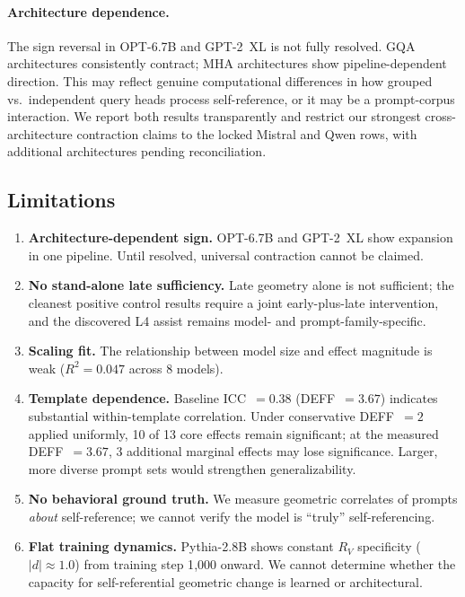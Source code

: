 \documentclass{article}
\newcommand{\RV}{R_V}
\newcommand{\dcohen}{d}
\begin{document}
\paragraph{Architecture dependence.}
The sign reversal in OPT-6.7B and GPT-2~XL is not fully resolved.
GQA architectures consistently contract; MHA architectures show pipeline-dependent direction.
This may reflect genuine computational differences in how grouped vs.\ independent query heads
process self-reference, or it may be a prompt-corpus interaction.
We report both results transparently and restrict our strongest cross-architecture contraction
claims to the locked Mistral and Qwen rows, with additional architectures pending reconciliation.

\subsection{Limitations}

\begin{enumerate}
\item \textbf{Architecture-dependent sign.}
      OPT-6.7B and GPT-2~XL show expansion in one pipeline. Until resolved, universal
      contraction cannot be claimed.
\item \textbf{No stand-alone late sufficiency.}
      Late geometry alone is not sufficient; the cleanest positive control results require a
      joint early-plus-late intervention, and the discovered L4 assist remains
      model- and prompt-family-specific.
\item \textbf{Scaling fit.}
      The relationship between model size and effect magnitude is weak
      ($R^2 = 0.047$ across 8 models).
\item \textbf{Template dependence.}
      Baseline ICC~$= 0.38$ (DEFF~$= 3.67$) indicates substantial within-template
      correlation.
      Under conservative DEFF~$= 2$ applied uniformly, 10 of 13 core effects remain
      significant; at the measured DEFF~$= 3.67$, 3 additional marginal effects
      may lose significance.
      Larger, more diverse prompt sets would strengthen generalizability.
\item \textbf{No behavioral ground truth.}
      We measure geometric correlates of prompts \emph{about} self-reference;
      we cannot verify the model is ``truly'' self-referencing.
\item \textbf{Flat training dynamics.}
      Pythia-2.8B shows constant $\RV$ specificity ($|\dcohen| \approx 1.0$) from training
      step 1{,}000 onward.
      We cannot determine whether the capacity for self-referential geometric change is
      learned or architectural.
\end{enumerate}
\end{document}
